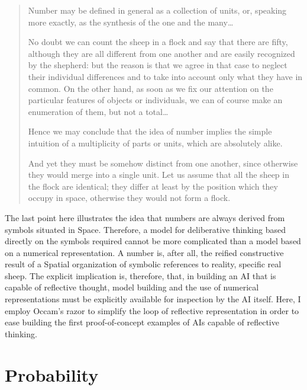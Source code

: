\begin{quote}
Number may be defined in general as a collection of units, or,
speaking more exactly, as the synthesis of the one and the
many\ldots

No doubt we can count the sheep in a flock and say that there are
fifty, although they are all different from one another and are easily
recognized by the shepherd: but the reason is that we agree in that
case to neglect their individual differences and to take into account
only what they have in common.  On the other hand, as soon as we fix
our attention on the particular features of objects or individuals, we
can of course make an enumeration of them, but not a total\ldots

Hence we may conclude that the idea of number implies the simple
intuition of a multiplicity of parts or units, which are absolutely
alike.

And yet they must be somehow distinct from one another, since
otherwise they would merge into a single unit.  Let us assume that all
the sheep in the flock are identical; they differ at least by the
position which they occupy in space, otherwise they would not form a
flock.
\end{quote}

The last point here illustrates the idea that numbers are always
derived from symbols situated in Space.  Therefore, a model for
deliberative thinking based directly on the symbols required cannot be
more complicated than a model based on a numerical representation.  A
number is, after all, the reified constructive result of a Spatial
organization of symbolic references to reality, specific real sheep.
The explicit implication is, therefore, that, in building an AI that
is capable of reflective thought, model building and the use of
numerical representations must be explicitly available for inspection
by the AI itself.  Here, I employ Occam's razor to simplify the loop
of reflective representation in order to ease building the first
proof-of-concept examples of AIs capable of reflective thinking.

\section{Probability}

